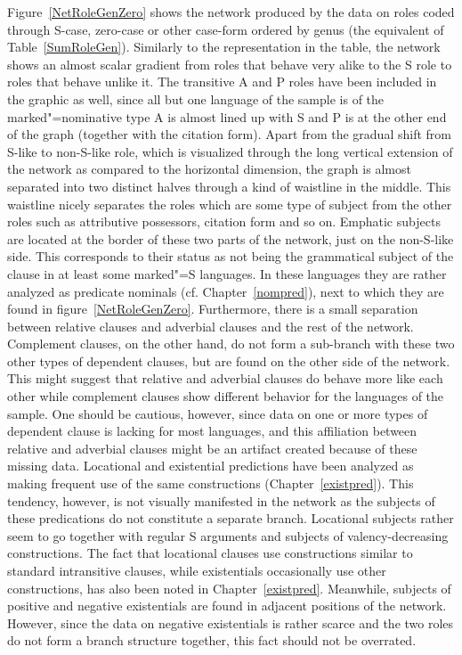 Figure~\vref{NetRoleGenZero} shows the network produced by the data on roles coded through S-case, zero-case or other case-form ordered by genus (the equivalent of Table~\ref{SumRoleGen}). 
Similarly to the representation in the table, the network shows an almost scalar gradient from roles that behave very alike to the S role to roles that behave unlike it.
The transitive A and P roles have been included in the graphic as well, since all but one language of the sample is of the marked"=nominative type A is almost lined up with S and P is at the other end of the graph (together with the citation form). 
Apart from the gradual shift from S-like to non-S-like role, which is visualized through the long vertical extension of the network as compared to the horizontal dimension, the graph is almost separated into two distinct halves through a kind of waistline in the middle. 
This waistline nicely separates the roles which are some type of subject from the other roles such as attributive possessors, citation form and so on. 
Emphatic subjects are located at the border of these two parts of the network, just on the non-S-like side. 
This corresponds to their status as not being the grammatical subject of the clause in at least some marked"=S languages. 
In these languages they are rather analyzed as predicate nominals (cf. Chapter~\ref{nompred}), next to which they are found in figure~\ref{NetRoleGenZero}. 
Furthermore, there is a small separation between relative clauses and adverbial clauses and the rest of the network. 
Complement clauses, on the other hand, do not form a sub-branch with these two other types of dependent clauses, but are found on the other side of the network. 
This might suggest that relative and adverbial clauses do behave more like each other while complement clauses show different behavior for the languages of the sample. 
One should be cautious, however, since data on one or more types of dependent clause is lacking for most languages, and this affiliation between relative and adverbial clauses might be an artifact created because of these missing data.
Locational and existential predictions have been analyzed as making frequent use of the same constructions (Chapter~\ref{existpred}). 
This tendency, however, is not visually manifested in the network as the subjects of these predications do not constitute a separate branch. 
Locational subjects rather seem to go together with regular S arguments and subjects of valency-decreasing constructions. 
The fact that locational clauses use constructions similar to standard intransitive clauses, while existentials occasionally use other constructions, has also been noted in Chapter~\ref{existpred}. 
Meanwhile, subjects of positive and negative existentials are found in adjacent positions of the network. 
However, since the data on negative existentials is rather scarce and the two roles do not form a branch structure together, this fact should not be overrated. 


